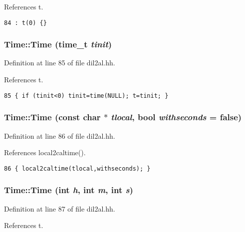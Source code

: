 References t.



\footnotesize\begin{verbatim}84 : t(0) {}
\end{verbatim}\normalsize 
{}
\subsubsection{\setlength{\rightskip}{0pt plus 5cm}Time::Time (time\_\-t {\em tinit})\hspace{0.3cm}{\tt  [inline]}}\label{classTime_a1}




Definition at line 85 of file dil2al.hh.

References t.



\footnotesize\begin{verbatim}85 { if (tinit<0) tinit=time(NULL); t=tinit; }
\end{verbatim}\normalsize 
{}
\subsubsection{\setlength{\rightskip}{0pt plus 5cm}Time::Time (const char $\ast$ {\em tlocal}, bool {\em withseconds} = {\bf false})\hspace{0.3cm}{\tt  [inline]}}\label{classTime_a2}




Definition at line 86 of file dil2al.hh.

References local2caltime().



\footnotesize\begin{verbatim}86 { local2caltime(tlocal,withseconds); }
\end{verbatim}\normalsize 
{}
\subsubsection{\setlength{\rightskip}{0pt plus 5cm}Time::Time (int {\em h}, int {\em m}, int {\em s})\hspace{0.3cm}{\tt  [inline]}}\label{classTime_a3}




Definition at line 87 of file dil2al.hh.

References t.



